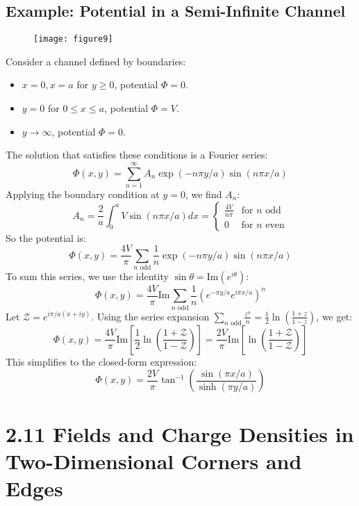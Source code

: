 \documentclass{article}
\begin{document}
	\subsection*{Example: Potential in a Semi-Infinite Channel}
	
	\begin{figure}[h]
		\centering
		\texttt{[image: figure9]}
		\caption{}
		\label{fig:figure9}
	\end{figure}
	
	Consider a channel defined by boundaries:
	\begin{itemize}
		\item \(x=0, x=a\) for \(y \ge 0\), potential \(\Phi=0\).
		\item \(y=0\) for \(0 \le x \le a\), potential \(\Phi=V\).
		\item \(y \to \infty\), potential \(\Phi=0\).
	\end{itemize}
	The solution that satisfies these conditions is a Fourier series:
	\[
	\Phi(x,y) = \sum_{n=1}^{\infty} A_n \exp(-n\pi y/a) \sin(n\pi x/a)
	\]
	Applying the boundary condition at \(y=0\), we find \(A_n\):
	\[
	A_n = \frac{2}{a} \int_0^a V \sin(n\pi x/a) dx = 
	\begin{cases}
		\frac{4V}{n\pi} & \text{for } n \text{ odd} \\
		0 & \text{for } n \text{ even}
	\end{cases}
	\]
	So the potential is:
	\[
	\Phi(x,y) = \frac{4V}{\pi} \sum_{n \text{ odd}} \frac{1}{n} \exp(-n\pi y/a) \sin(n\pi x/a)
	\]
	To sum this series, we use the identity \(\sin\theta = \text{Im}(e^{i\theta})\):
	\[
	\Phi(x,y) = \frac{4V}{\pi} \text{Im} \sum_{n \text{ odd}} \frac{1}{n} \left( e^{-\pi y/a} e^{i\pi x/a} \right)^n
	\]
	Let \(\mathcal{Z} = e^{i\pi/a (x+iy)}\). Using the series expansion \(\sum_{n \text{ odd}} \frac{z^n}{n} = \frac{1}{2} \ln\left(\frac{1+z}{1-z}\right)\), we get:
	\[
	\Phi(x,y) = \frac{4V}{\pi} \text{Im} \left[ \frac{1}{2} \ln\left(\frac{1+\mathcal{Z}}{1-\mathcal{Z}}\right) \right] = \frac{2V}{\pi} \text{Im} \left[ \ln\left(\frac{1+\mathcal{Z}}{1-\mathcal{Z}}\right) \right]
	\]
	This simplifies to the closed-form expression:
	\[
	\Phi(x,y) = \frac{2V}{\pi} \tan^{-1}\left( \frac{\sin(\pi x/a)}{\sinh(\pi y/a)} \right)
	\]
	
	\hrulefill
	
	\section*{2.11 Fields and Charge Densities in Two-Dimensional Corners and Edges}
\end{document}
